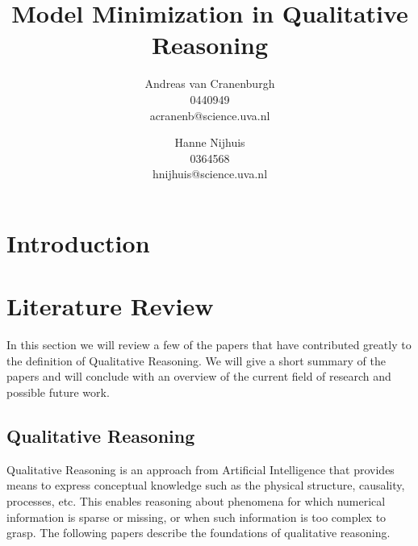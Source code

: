 \documentclass{article} %
\title{Model Minimization in Qualitative Reasoning}
\author{Andreas van Cranenburgh \\ 0440949 \\ acranenb@science.uva.nl 
\and Hanne Nijhuis \\ 0364568 \\ hnijhuis@science.uva.nl}
\begin{document}
\maketitle


\vspace{4em}


\newpage

\tableofcontents

\newpage

\section{Introduction}

\section{Literature Review}

In this section we will review a few of the papers that have contributed
greatly to the definition of Qualitative Reasoning. We will give a short
summary of the papers and will conclude with an overview of the current field
of research and possible future work. 

\subsection{Qualitative Reasoning}
Qualitative Reasoning is an approach from Artificial Intelligence that provides
means to express conceptual knowledge such as the physical structure,
causality, processes, etc.  This enables reasoning about phenomena for which
numerical information is sparse or missing, or when such information is too
complex to grasp.  The following papers describe the foundations of qualitative
reasoning.
\end{document}
